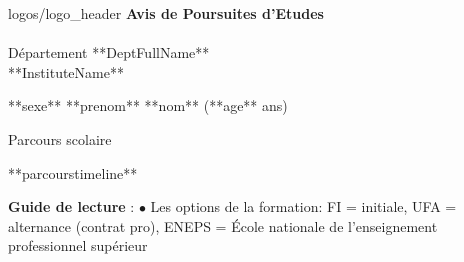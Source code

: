 


\begin{entete}{logos/logo_header}
		\textbf{\Huge{Avis de Poursuites d'Etudes}} \\
		\ligne \\
		\normalsize{Département **DeptFullName**} \\
		\normalsize{**InstituteName**} \\
\end{entete}

\begin{nom}
**sexe** **prenom** **nom** (**age** ans)
\end{nom}


\begin{rubrique}{Parcours scolaire}

**parcourstimeline**

{
\scriptsize
\textbf{Guide de lecture} : 
$\bullet$ Les options de la formation: FI = initiale, UFA = alternance (contrat pro), ENEPS = École nationale de l'enseignement professionnel supérieur
}
\end{rubrique}



